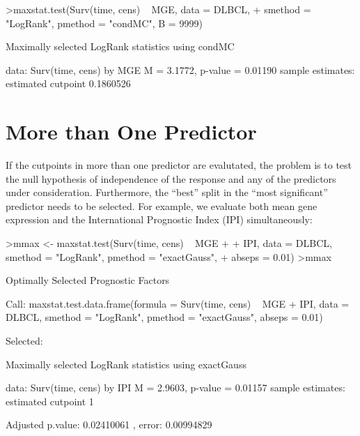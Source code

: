 \documentclass{article}
\renewcommand{\baselinestretch}{1.5}
\begin{document}
\begin{Schunk}
\begin{Sinput}
>maxstat.test(Surv(time, cens) ~ MGE, data = DLBCL, 
+     smethod = "LogRank", pmethod = "condMC", B = 9999)
\end{Sinput}
\begin{Soutput}
	Maximally selected LogRank statistics using condMC

data:  Surv(time, cens) by MGE 
M = 3.1772, p-value = 0.01190
sample estimates:
estimated cutpoint 
         0.1860526 
\end{Soutput}
\end{Schunk}



\section{More than One Predictor}

If the cutpoints in more than one predictor are evalutated, the problem is
to test the null hypothesis of independence of the response and any of the
predictors under consideration. Furthermore, the ``best'' split in the
``most significant'' predictor needs to be selected. For example, we
evaluate both mean gene expression and the International Prognostic Index
(IPI) simultaneously:

\renewcommand{\baselinestretch}{1}
\begin{Schunk}
\begin{Sinput}
>mmax <- maxstat.test(Surv(time, cens) ~ MGE + 
+     IPI, data = DLBCL, smethod = "LogRank", pmethod = "exactGauss", 
+     abseps = 0.01)
>mmax
\end{Sinput}
\begin{Soutput}
	 Optimally Selected Prognostic Factors 

Call: maxstat.test.data.frame(formula = Surv(time, cens) ~ MGE + IPI, 
    data = DLBCL, smethod = "LogRank", pmethod = "exactGauss", 
    abseps = 0.01)


 Selected: 

	Maximally selected LogRank statistics using
	exactGauss

data:  Surv(time, cens) by IPI 
M = 2.9603, p-value = 0.01157
sample estimates:
estimated cutpoint 
                 1 

Adjusted p.value: 
0.02410061 , error:  0.00994829 
\end{Soutput}
\end{Schunk}
\renewcommand{\baselinestretch}{1.5}
\end{document}
